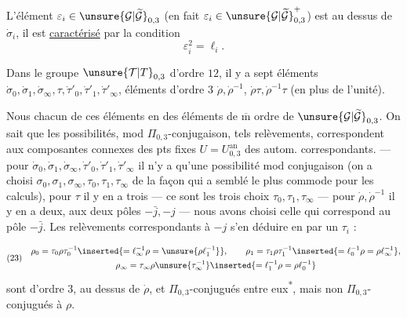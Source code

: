 L'élément $\varepsilon_i\in\unsure{\mathcal G|\widetilde{\mathcal G}}_{0,3}$
(en fait $\varepsilon_i\in\unsure{\mathcal G|\widetilde{\mathcal G}}_{0,3}^{+}$) est au dessus de $\dot\sigma_i$,
il est \uline{caractérisé} par la condition
\[
\varepsilon_i^2=\ell_i.
\]

Dans le groupe $\unsure{\mathcal T|T}_{0,3}$ d'ordre $12$, il y a sept éléments 
$\dot\sigma_0,\dot\sigma_1,\dot\sigma_\infty,\tau,\dot\tau'_0,\dot\tau'_1,\dot\tau'_\infty$,
  éléments d'ordre $3$
$\dot\rho,\dot\rho^{-1}$, 
$\dot\rho\tau,\dot\rho^{-1}\tau$ (en plus de l'unité).

Nous   chacun de ces éléments en des éléments de $\overline{\mathrm m}$ ordre de
$\unsure{\mathcal G|\widetilde{\mathcal G}}_{0,3}$.
On sait que les possibilités, mod $\Pi_{0,3}$-conjugaison,  tels relèvements,
correspondent aux composantes connexes des pts fixes  $U=U_{0,3}^{\mathrm{an}}$
des autom.  correspondants. --- pour
$\dot\sigma_0,\dot\sigma_1,\dot\sigma_\infty,\dot\tau'_0,\dot\tau'_1,\dot\tau'_\infty$
il n'y a qu'une possibilité mod conjugaison (on a choisi
$\sigma_0,\sigma_1,\sigma_\infty,\tau_0,\tau_1,\tau_\infty$
de la façon qui a semblé le plus commode pour les calculs),
pour $\tau$ il y en a trois --- ce sont les trois choix $\tau_0,\tau_1,\tau_\infty$
--- pour $\dot\rho,\dot\rho^{-1}$ il y en a deux,
 aux deux pôles $-\bar j,-j$ --- nous avons choisi celle qui
correspond au pôle $-\bar j$.
Les relèvements correspondants à $-j$  s'en déduire en  par un $\tau_i$ :



\[
(23)\quad
\begin{gathered}
\rho_0=\tau_0\rho\tau_0^{-1}
\inserted{=\ell_\infty^{-1}\rho=\unsure{\rho \ell_1^{-1}}},\qquad
\rho_1=\tau_1\rho\tau_1^{-1}
\inserted{=\ell_0^{-1}\rho=\rho \ell_\infty^{-1}},\\
\rho_\infty=\tau_\infty\rho\unsure{\tau_\infty^{-1}}
\inserted{=\ell_1^{-1}\rho=\rho \ell_0^{-1}}
\end{gathered}
\]
sont d'ordre 3, au dessus de $\dot\rho$, et $\Pi_{0,3}$-conjugués entre eux\textsuperscript{*}, mais non $\Pi_{0,3}$-conjugués à $\rho$.

